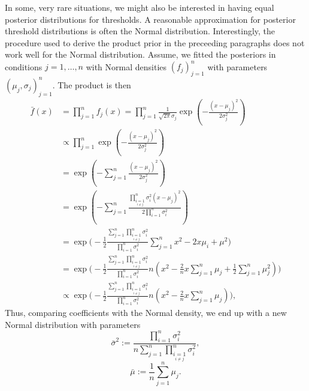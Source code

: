 \documentclass[a4paper,11pt]{scrartcl}
\begin{document}
In some, very rare situations, we might also be interested in having equal posterior distributions for thresholds.
A reasonable approximation for posterior threshold distributions is often the Normal distribution.
Interestingly, the procedure used to derive the product prior in the preceeding paragraphs does not work well for the Normal distribution.
Assume, we fitted the posteriors in conditions $j=1,\dots,n$ with Normal densities $(f_j)_{j=1}^n$ with parameters $(\mu_j,\sigma_j)_{j=1}^n$.
The product is then
%
\begin{align*}
    \bar{f}(x) &= \prod_{j=1}^n f_j(x) = \prod_{j=1}^n \frac{1}{\sqrt{2\pi}\sigma_j} \exp ( - \frac{(x-\mu_j)^2}{2\sigma_j^2})\\
    &\propto \prod_{j=1}^n \exp ( - \frac{(x-\mu_j)^2}{2\sigma_j^2})\\
    &= \exp ( - \sum_{j=1}^n \frac{(x-\mu_j)^2}{2\sigma_j^2} ) \\
    &= \exp ( - \sum_{j=1}^n \frac{\prod_{\underset{i\neq j}{i=1}}^n \sigma_i^2 (x-\mu_j)^2}{2\prod_{i=1}^n \sigma_i^2} ) \\
    &= \exp \big( - \frac{1}{2}\frac{\sum_{j=1}^n \prod_{\underset{i\neq j}{i=1}}^n \sigma_i^2}{\prod_{i=1}^n \sigma_i^2}
        \sum_{j=1}^n x^2 - 2x\mu_i + \mu^2 \big)\\
    &= \exp \big( - \frac{1}{2}\frac{\sum_{j=1}^n \prod_{\underset{i\neq j}{i=1}}^n \sigma_i^2}{\prod_{i=1}^n \sigma_i^2}
        n( x^2 - \frac{2}{n}x\sum_{j=1}^n\mu_j + \frac{1}{2}\sum_{j=1}^n\mu_j^2)\big) \\
    &\propto \exp \big( - \frac{1}{2}\frac{\sum_{j=1}^n \prod_{\underset{i\neq j}{i=1}}^n \sigma_i^2}{\prod_{i=1}^n \sigma_i^2}
        n ( x^2 - \frac{2}{n}x\sum_{j=1}^n\mu_j )\big),
\end{align*}
%
Thus, comparing coefficients with the Normal density, we end up with a new Normal distribution with parameters
%
$$
\bar{\sigma}^2 := \frac{\prod_{i=1}^n \sigma_i^2}{n\sum_{j=1}^n \prod_{\underset{i\neq j}{i=1}}^n \sigma_i^2},
$$
%
$$
\bar{\mu} := \frac{1}{n} \sum_{j=1}^n\mu_j.
$$
%
\end{document}
